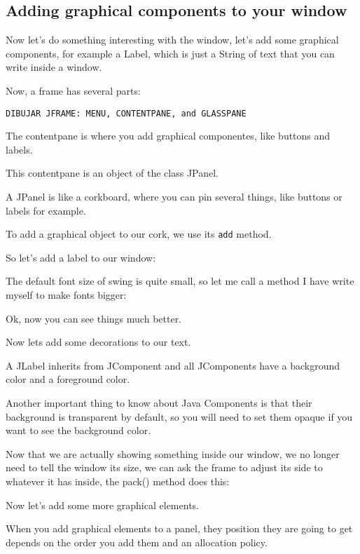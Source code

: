 \documentclass[a4paper, 9pt]{extarticle}
\begin{document}
\subsection{Adding graphical components to your window}

Now let's do something interesting with the window, let's add some graphical
components, for example a Label, which is just a String of text that you can
write inside a window.

Now, a frame has several parts:

\verb+DIBUJAR JFRAME: MENU, CONTENTPANE, and GLASSPANE+

The contentpane is where you add graphical componentes, like buttons and
labels.

This contentpane is an object of the class JPanel.

A JPanel is like a corkboard, where you can pin several things, like buttons or
labels for example.

To add a graphical object to our cork, we use its \verb+add+ method.

So let's add a label to our window:


The default font size of swing is quite small, so let me call a method I have
write myself to make fonts bigger:


Ok, now you can see things much better.

Now lets add some decorations to our text.

A JLabel inherits from JComponent and all JComponents have a background color
and a foreground color.

Another important thing to know about Java Components is that their background
is transparent by default, so you will need to set them opaque if you want to
see the background color.


Now that we are actually showing something inside our window, we no longer need
to tell the window its size, we can ask the frame to adjust its side to
whatever it has inside, the pack() method does this:



Now let's add some more graphical elements.

When you add graphical elements to a panel, they position they are going to get
depends on the order you add them and an allocation policy.
\end{document}
